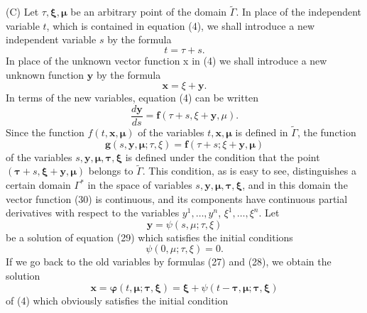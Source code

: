 \documentclass[10pt,a5paper]{book}
\makeatletter
\theoremstyle{plain}
\theoremstyle{definition}
\theoremstyle{remark}
\renewenvironment{proof}[1][\proofname]{\par
  \pushQED{\qed}%
  \normalfont\topsep6\p@\@plus6\p@\relax
  \trivlist
  \item\relax{\itshape #1\@addpunct{.}}\hspace\labelsep\ignorespaces
}{\popQED\endtrivlist\@endpefalse}
\makeatother
\begin{document}
\begin{proof}
(C) Let $\tau, \boldsymbol{\xi}, \boldsymbol{\mu}$ be an arbitrary point of the domain $\widetilde{\Gamma}$. In place of the independent variable $t$, which is contained in equation (4), we shall introduce a new independent variable $s$ by the formula
\begin{equation*}
t=\tau+s . \tag{27}
\end{equation*}
In place of the unknown vector function x in (4) we shall introduce a new unknown function $\mathbf{y}$ by the formula
\begin{equation*}
\mathbf{x}=\xi+\mathbf{y} . \tag{28}
\end{equation*}
In terms of the new variables, equation (4) can be written
\begin{equation*}
\frac{d \mathbf{y}}{d s}=\mathbf{f}(\tau+s, \xi+\mathbf{y}, \mu) . \tag{29}
\end{equation*}
Since the function $f(t, \mathbf{x}, \boldsymbol{\mu})$ of the variables $t, \mathbf{x}, \boldsymbol{\mu}$ is defined in $\widetilde{\Gamma}$, the function
\begin{equation*}
\mathbf{g}(s, \mathbf{y}, \boldsymbol{\mu} ; \tau, \xi)=\mathbf{f}(\tau+s ; \xi+\mathbf{y}, \boldsymbol{\mu}) \tag{30}
\end{equation*}
of the variables $s, \mathbf{y}, \boldsymbol{\mu}, \boldsymbol{\tau}, \boldsymbol{\xi}$ is defined under the condition that the point $(\boldsymbol{\tau}+s, \boldsymbol{\xi}+\mathbf{y}, \boldsymbol{\mu})$ belongs to $\widetilde{\Gamma}$. This condition, as is easy to see, distinguishes a certain domain $\Gamma^{*}$ in the space of variables $s, \mathbf{y}, \boldsymbol{\mu}, \boldsymbol{\tau}, \boldsymbol{\xi}$, and in this domain the vector function (30) is continuous, and its components
have continuous partial derivatives with respect to the variables $y^{1}, \ldots, y^{n}$, $\xi^{1}, \ldots, \xi^{n}$. Let
\begin{equation*}
\mathbf{y}=\psi(s, \mu ; \tau, \xi) \tag{31}
\end{equation*}
be a solution of equation (29) which satisfies the initial conditions
\[
\psi(0, \mu ; \tau, \xi)=0 .
\]
If we go back to the old variables by formulas (27) and (28), we obtain the solution
\begin{equation*}
\mathbf{x}=\boldsymbol{\varphi}(t, \boldsymbol{\mu} ; \boldsymbol{\tau}, \boldsymbol{\xi})=\boldsymbol{\xi}+\psi(t-\boldsymbol{\tau}, \boldsymbol{\mu} ; \boldsymbol{\tau}, \boldsymbol{\xi}) \tag{32}
\end{equation*}
of (4) which obviously satisfies the initial condition

\end{proof}
\end{document}
